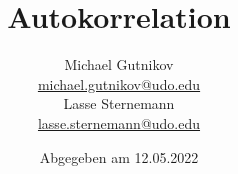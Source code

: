 

\title{Autokorrelation}
\author{
  Michael Gutnikov\\
  \href{mailto:michael.gutnikov@udo.edu}{michael.gutnikov@udo.edu}\\
  Lasse Sternemann\\
  \href{mailto:lasse.sternemann@udo.edu}{lasse.sternemann@udo.edu}
}
\date{Abgegeben am 12.05.2022}


    \maketitle
    \newpage
    \tableofcontents
    \newpage

    


    \newpage
    \printbibliography

